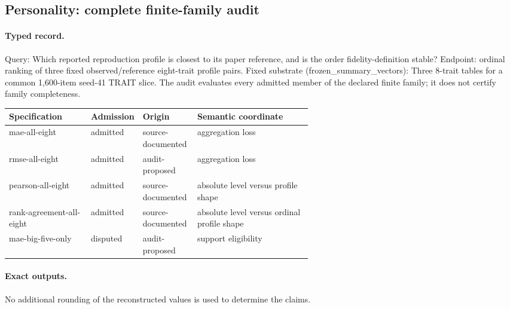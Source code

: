 \clearpage
\subsection{Personality: complete finite-family audit}\label{app:r8-personality}

\paragraph{Typed record.} Query: Which reported reproduction profile is closest to its paper reference, and is the order fidelity-definition stable? Endpoint: ordinal ranking of three fixed observed/reference eight-trait profile pairs. Fixed substrate (frozen\_summary\_vectors): Three 8-trait tables for a common 1,600-item seed-41 TRAIT slice. The audit evaluates every admitted member of the declared finite family; it does not certify family completeness.

\begingroup
\scriptsize
\begin{tabularx}{\linewidth}{@{}p{0.27\linewidth}p{0.14\linewidth}p{0.18\linewidth}X@{}}
\toprule
Specification & Admission & Origin & Semantic coordinate \\
\midrule
mae-all-eight & admitted & source-documented & aggregation loss \\
rmse-all-eight & admitted & audit-proposed & aggregation loss \\
pearson-all-eight & admitted & source-documented & absolute level versus profile shape \\
rank-agreement-all-eight & admitted & source-documented & absolute level versus ordinal profile shape \\
mae-big-five-only & disputed & audit-proposed & support eligibility \\
\bottomrule
\end{tabularx}
\endgroup

\paragraph{Exact outputs.} No additional rounding of the reconstructed values is used to determine the claims.

